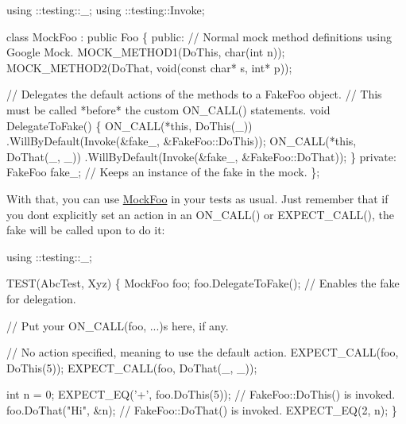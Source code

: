 \begin{DoxyCode}
using ::testing::\_;
using ::testing::Invoke;

\textcolor{keyword}{class }MockFoo : \textcolor{keyword}{public} Foo \{
 \textcolor{keyword}{public}:
  \textcolor{comment}{// Normal mock method definitions using Google Mock.}
  MOCK\_METHOD1(DoThis, \textcolor{keywordtype}{char}(\textcolor{keywordtype}{int} n));
  MOCK\_METHOD2(DoThat, \textcolor{keywordtype}{void}(\textcolor{keyword}{const} \textcolor{keywordtype}{char}* s, \textcolor{keywordtype}{int}* p));

  \textcolor{comment}{// Delegates the default actions of the methods to a FakeFoo object.}
  \textcolor{comment}{// This must be called *before* the custom ON\_CALL() statements.}
  \textcolor{keywordtype}{void} DelegateToFake() \{
    ON\_CALL(*\textcolor{keyword}{this}, DoThis(\_))
        .WillByDefault(Invoke(&fake\_, &FakeFoo::DoThis));
    ON\_CALL(*\textcolor{keyword}{this}, DoThat(\_, \_))
        .WillByDefault(Invoke(&fake\_, &FakeFoo::DoThat));
  \}
 \textcolor{keyword}{private}:
  FakeFoo fake\_;  \textcolor{comment}{// Keeps an instance of the fake in the mock.}
\};
\end{DoxyCode}


With that, you can use {\ttfamily \hyperlink{classMockFoo}{Mock\+Foo}} in your tests as usual. Just remember that if you don\textquotesingle{}t explicitly set an action in an {\ttfamily O\+N\+\_\+\+C\+A\+L\+L()} or {\ttfamily E\+X\+P\+E\+C\+T\+\_\+\+C\+A\+L\+L()}, the fake will be called upon to do it\+:


\begin{DoxyCode}
using ::testing::\_;

TEST(AbcTest, Xyz) \{
  MockFoo foo;
  foo.DelegateToFake(); \textcolor{comment}{// Enables the fake for delegation.}

  \textcolor{comment}{// Put your ON\_CALL(foo, ...)s here, if any.}

  \textcolor{comment}{// No action specified, meaning to use the default action.}
  EXPECT\_CALL(foo, DoThis(5));
  EXPECT\_CALL(foo, DoThat(\_, \_));

  \textcolor{keywordtype}{int} n = 0;
  EXPECT\_EQ(\textcolor{charliteral}{'+'}, foo.DoThis(5));  \textcolor{comment}{// FakeFoo::DoThis() is invoked.}
  foo.DoThat(\textcolor{stringliteral}{"Hi"}, &n);           \textcolor{comment}{// FakeFoo::DoThat() is invoked.}
  EXPECT\_EQ(2, n);
\}
\end{DoxyCode}


